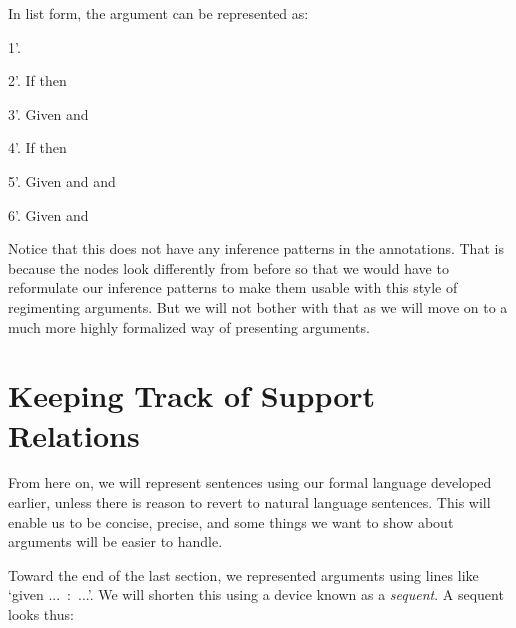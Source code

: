 In list form,  the argument can be represented as:

\begin{argument*}

\item[1'.]  
\item[2'.] If  then 
\item[3'.] Given  and  
\item[4'.] If  then 
\item[5'.] Given  and  and   
\item[6'.] Given  and  

\end{argument*}


Notice that this does not have any inference patterns in the annotations.  That 
is because the nodes look differently from before so that we would have to 
reformulate our inference patterns to make them usable with this style of 
regimenting arguments. But we will not bother with that as we will move on to a 
much more highly formalized way of presenting arguments.





\section{Keeping Track of Support Relations}\label{sec:supportRelations}


From here on, we will represent sentences using our formal language \lL{} 
developed earlier, unless there is reason to revert to natural language 
sentences. This will enable us to be concise, precise, and some things we want 
to show about arguments will be easier to handle. 

Toward the end of the last section, we represented arguments using lines like 
`given ...~:~...'. We will shorten this using a  device known as  a  
\emph{sequent}. A sequent looks thus:

\begin{center}


\end{center}

